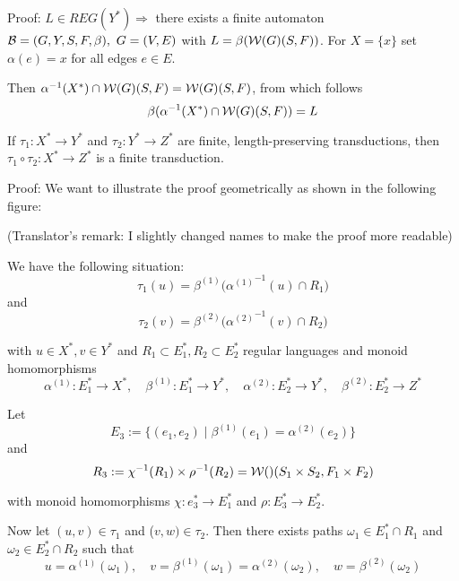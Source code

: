 Proof: $L \in REG(Y^*) \Rightarrow$ there exists a finite automaton $\mbox{$\mathcal{B}$} =
(G, Y, S, F, \beta),\ G= (V, E)$ with $L = \beta(\mbox{$\mathcal{W}(G)$}(S, F))$. For $X =
\{x\}$ set $\alpha(e) = x$ for all edges $e \in E$.

Then $\alpha^{-1}(X^*) \cap \mbox{$\mathcal{W}(G)$}(S, F) = \mbox{$\mathcal{W}(G)$}(S, F)$, from which
follows \[\beta(\alpha^{-1}(X^*) \cap \mbox{$\mathcal{W}(G)$}(S, F)) = L\]

\begin{theorem}
If $\tau_1 : X^* \to Y^*$ and $\tau_2 : Y^* \to Z^*$ are finite,
length-preserving transductions, then $\tau_1 \circ \tau_2 : X^* \to Z^*$ is a
finite transduction.
\end{theorem}

Proof: We want to illustrate the proof geometrically as shown in the following
figure:

\begin{center}
\end{center}

(Translator's remark: I slightly changed names to make the proof more readable)

We have the following situation:
\[ \tau_1(u) = \beta^{(1)}\big( {\alpha^{(1)}}^{-1}(u) \cap R_1 \big) \]
and
\[ \tau_2(v) = \beta^{(2)}\big( {\alpha^{(2)}}^{-1}(v) \cap R_2 \big) \]

with $u \in X^*, v \in Y^*$ and $R_1 \subset E_1^*, R_2 \subset E_2^*$ regular
languages and monoid homomorphisms
\[ \alpha^{(1)} : E_1^* \to X^*,\quad \beta^{(1)} : E_1^* \to
Y^*,\quad \alpha^{(2)} : E_2^* \to Y^*,\quad \beta^{(2)} : E_2^* \to Z^* \]

Let
\[ E_3 := \{ (e_1, e_2) \mid \beta^{(1)}(e_1) = \alpha^{(2)}(e_2) \} \]
and 
\[ R_3 := \chi^{-1}(R_1) \times \rho^{-1}(R_2) = \mbox{$\mathcal{W}()$}(S_1 \times S_2, F_1
\times F_2) \]

with monoid homomorphisms $\chi: e_3^* \to E_1^*$ and $\rho: E_3^* \to E_2^*$.

Now let $(u, v) \in \tau_1$ and ($v, w) \in \tau_2$. Then there exists paths
$\omega_1 \in E_1^* \cap R_1$ and $\omega_2 \in E_2^* \cap R_2$ such that 
\[ u = \alpha^{(1)}(\omega_1),\quad v = \beta^{(1)}(\omega_1) =
\alpha^{(2)}(\omega_2),\quad w = \beta^{(2)}(\omega_2) \]

